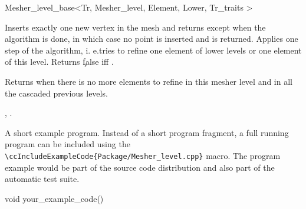 \begin{ccRefClass}{Mesher_level_base<Tr, Mesher_level, Element, Lower,
Tr_traits >}
 
\begin{ccAdvanced}
 
 {Inserts exactly one new vertex in the mesh  and returns 
 except when the algorithm is done, in which case no point is inserted
and  is returned.}
\ccGlue  
 {Applies one step of the algorithm, i. e.tries to refine one element of
   lower levels or one element of this level. Returns \c false iff 
   . }

{Returns  when there is no more elements to refine
in this mesher level and in all the cascaded previous levels.}

\end{ccAdvanced}







\ccSeeAlso

,
.

\ccExample

A short example program.
Instead of a short program fragment, a full running program can be
included using the 
\verb|\ccIncludeExampleCode{Package/Mesher_level.cpp}| 
macro. The program example would be part of the source code distribution and
also part of the automatic test suite.

\begin{ccExampleCode}
void your_example_code() {
}
\end{ccExampleCode}


\end{ccRefClass}


